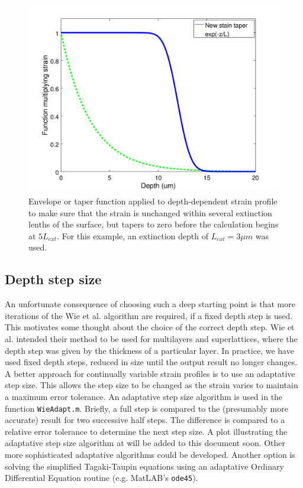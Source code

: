 \documentclass[letterpaper,11pt]{article}
\begin{document}
\begin{figure}
\begin{centering}
\includegraphics[scale = 0.65]{Taper_functions.png}
\caption{Envelope or taper function applied to depth-dependent strain profile to make sure that the strain is unchanged within several extinction lenths of the surface, but tapers to zero before the calculation begins at $5L_{ext}$.  For this example, an extinction depth of $L_{ext}=3 \mu m$ was used.}
\label{fig:taper_fig}
\end{centering}
\end{figure}

\subsection{Depth step size}
An unfortunate consequence of choosing such a deep starting point is that more iterations of the Wie et al. algorithm are required, if a fixed depth step is used.  This motivates some thought about the choice of the correct depth step.  Wie et al. intended their method to be used for multilayers and superlattices, where the depth step was given by the thickness of a particular layer.  In practice, we have used fixed depth steps, reduced in size until the output result no longer changes.  A better approach for continually variable strain profiles is to use an adaptative step size.  This allows the step size to be changed as the strain varies to maintain a maximum error tolerance.  An adaptative step size algorithm is used in the function \texttt{WieAdapt.m}.  Briefly, a full step is compared to the (presumably more accurate) result for two successive half steps. The difference is compared to a relative error tolerance to determine the next step size.  A plot illustrating the adaptative step size algorithm at will be added to this document soon.  Other more sophisticated adaptative algorithms could be developed. Another option is solving the simplified Tagaki-Taupin equations using an adaptative Ordinary Differential Equation routine (e.g. MatLAB's \texttt{ode45}).  
\end{document}
